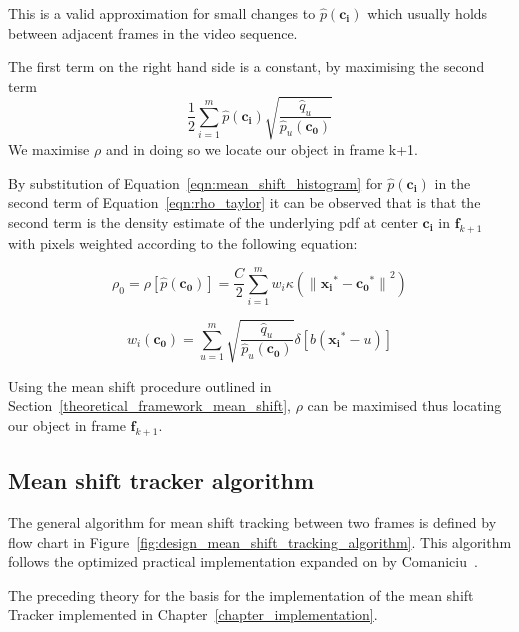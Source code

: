 This is a valid approximation for small changes to $\hat{p}(\mathbf{c_i})$
which usually holds between adjacent frames in the video sequence. 

The first term on the right hand side is a constant, by maximising the second
term 
\[\frac{1}{2}\sum_{i=1}^{m}\hat{p}(\mathbf{c_i})\sqrt{\frac{\hat{q}_u}{\hat{p}_u(\mathbf{c_0})}}\]
We maximise $\rho$ and in doing so we locate our object in frame k+1.

By substitution of Equation~\ref{eqn:mean_shift_histogram} for $\hat{p}(\mathbf{c_i})$ in
the second term of Equation~\ref{eqn:rho_taylor} it can be observed that is that the
second term is the density estimate of the underlying pdf at center
$\mathbf{c_i}$ in $\mathbf{f}_{k+1}$ with pixels weighted according to the
following equation:

\[\rho_0=\rho[\hat{p}(\mathbf{c_0})]=\frac{C}{2}\sum_{i=1}^{m}w_i\kappa({\parallel{\mathbf{x_i}^*}-{\mathbf{c_0}^*}\parallel}^2)\]

\begin{equation}\label{eqn:mean_shift_weights}
    w_i(\mathbf{c_0})=\sum_{u=1}^{m}\sqrt{\frac{\hat{q}_u}{\hat{p}_u(\mathbf{c_0})}}\delta[b(\mathbf{x_i}^*-u)]
\end{equation}

Using the mean shift procedure outlined in Section~\ref{theoretical_framework_mean_shift}, $\rho$ can be maximised thus locating
our object in frame $\mathbf{f}_{k+1}$.

\subsection{Mean shift tracker algorithm}\label{theoretical_framework_mean_shift_algorithm}
The general algorithm for mean shift tracking between two frames is defined by
flow chart in Figure~\ref{fig:design_mean_shift_tracking_algorithm}. This algorithm follows
the optimized practical implementation expanded on by Comaniciu~\cite{Comaniciu2003}. 


The preceding theory for the basis for the implementation of the mean shift
Tracker implemented in Chapter~\ref{chapter_implementation}.
